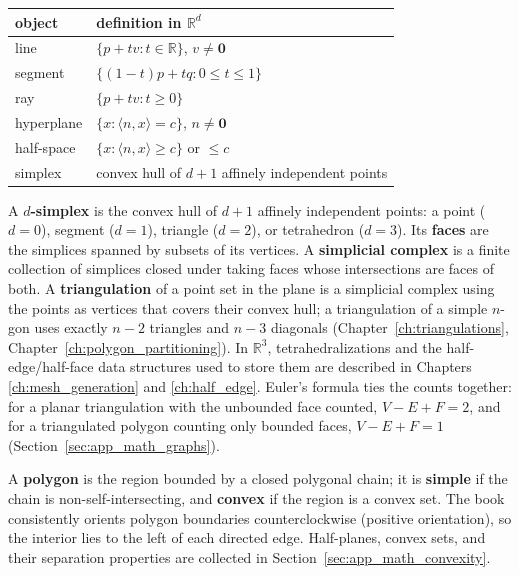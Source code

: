 \begin{center}
\begin{tabular}{ll}
\toprule
object & definition in $\mathbb{R}^d$ \\
\midrule
line & $\{ p + t v : t \in \mathbb{R} \}$, $v \neq \mathbf{0}$ \\
segment & $\{ (1-t)p + t q : 0 \le t \le 1 \}$ \\
ray & $\{ p + t v : t \ge 0 \}$ \\
hyperplane & $\{ x : \langle n, x\rangle = c \}$, $n \neq \mathbf{0}$ \\
half-space & $\{ x : \langle n, x\rangle \ge c \}$ or $\le c$ \\
simplex & convex hull of $d+1$ affinely independent points \\
\bottomrule
\end{tabular}
\end{center}

A \textbf{$d$-simplex} is the convex hull of $d+1$ affinely independent
points: a point ($d=0$), segment ($d=1$), triangle ($d=2$), or tetrahedron
($d=3$). Its \textbf{faces} are the simplices spanned by subsets of its
vertices. A \textbf{simplicial complex} is a finite collection of simplices
closed under taking faces whose intersections are faces of both. A
\textbf{triangulation} of a point set in the plane is a simplicial complex
using the points as vertices that covers their convex hull; a triangulation
of a simple $n$-gon uses exactly $n-2$ triangles and $n-3$ diagonals
(Chapter~\ref{ch:triangulations}, Chapter~\ref{ch:polygon_partitioning}).
In $\mathbb{R}^3$, tetrahedralizations and the half-edge/half-face data
structures used to store them are described in Chapters
\ref{ch:mesh_generation} and \ref{ch:half_edge}. Euler's formula ties the
counts together: for a planar triangulation with the unbounded face counted,
$V - E + F = 2$, and for a triangulated polygon counting only bounded faces,
$V - E + F = 1$ (Section~\ref{sec:app_math_graphs}).

A \textbf{polygon} is the region bounded by a closed polygonal chain; it is
\textbf{simple} if the chain is non-self-intersecting, and \textbf{convex} if
the region is a convex set. The book consistently orients polygon boundaries
counterclockwise (positive orientation), so the interior lies to the left of
each directed edge. Half-planes, convex sets, and their separation properties
are collected in Section~\ref{sec:app_math_convexity}.

